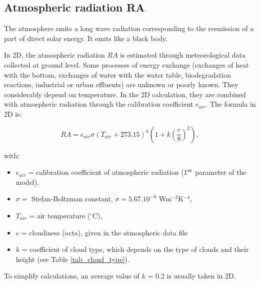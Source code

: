 \subsection{Atmospheric radiation RA}

The atmosphere emits a long wave radiation corresponding to the reemission of a
part of direct solar energy. It emits like a black body.

In 2D, the atmospheric radiation $RA$ is estimated through meteorological data collected at ground level.
Some processes of energy exchange (exchanges of heat with the bottom,
exchanges of water with the water table, biodegradation reactions,
industrial or urban effluents) are unknown or poorly known.
They considerably depend on temperature.
In the 2D calculation, they are combined with atmospheric radiation
through the calibration coefficient $e_{air}$. The formula in 2D is:

\begin{equation}
  RA = e_{air} \sigma (T_{air} + 273.15 )^4 \left( 1+k\left( \frac{c}{8} \right) ^2 \right),
\end{equation}

with:
\begin{itemize}
  \item $e_{air}$ = calibration coefficient of atmospheric radiation (1$^{\rm{st}}$ parameter of the model),
  \item $\sigma = $ Stefan-Boltzman constant, $\sigma = 5.67.10^{-8}$ Wm$^{-2}$K$^{-4}$,
  \item $T_{air}$ = air temperature ($^{\circ}$C),
  \item $c$ = cloudiness (octa), given in the atmospheric data file
  \item $k$ = coefficient of cloud type, which depends on the type of clouds and their height
    (see Table \ref{tab_cloud_type}).
\end{itemize}
To simplify calculations, an average value of $k$ = 0.2 is usually taken in 2D.\\

